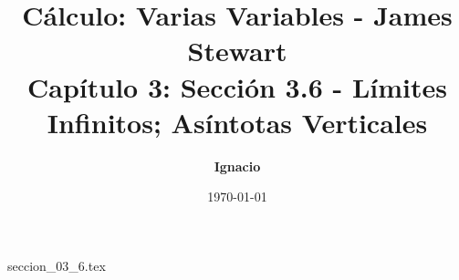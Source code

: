 \documentclass[11pt,spanish,oneside]{report}
\title{\textbf{Cálculo: Varias Variables - James Stewart} \\ \Large Capítulo 3: Sección 3.6 - Límites Infinitos; Asíntotas Verticales}
\author{\textbf{Ignacio}}
\date{\today}
\begin{document}
\maketitle

{seccion_03_6.tex}
\end{document}
